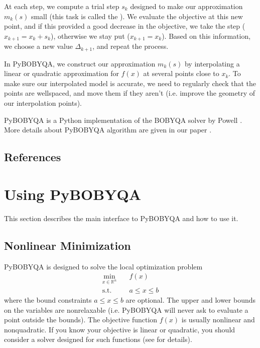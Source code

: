 \documentclass[letterpaper,10pt,english]{sphinxmanual}
\begin{document}
At each step, we compute a trial step \(s_k\) designed to make our approximation \(m_k(s)\) small (this task is called the ). We evaluate the objective at this new point, and if this provided a good decrease in the objective, we take the step (\(x_{k+1}=x_k+s_k\)), otherwise we stay put (\(x_{k+1}=x_k\)). Based on this information, we choose a new value \(\Delta_{k+1}\), and repeat the process.

In Py\sphinxhyphen{}BOBYQA, we construct our approximation \(m_k(s)\) by interpolating a linear or quadratic approximation for \(f(x)\) at several points close to \(x_k\). To make sure our interpolated model is accurate, we need to regularly check that the points are well\sphinxhyphen{}spaced, and move them if they aren’t (i.e. improve the geometry of our interpolation points).

Py\sphinxhyphen{}BOBYQA is a Python implementation of the BOBYQA solver by Powell . More details about Py\sphinxhyphen{}BOBYQA algorithm are given in our paper .


\section{References}
\label{\detokenize{info:references}}

\chapter{Using Py\sphinxhyphen{}BOBYQA}
\label{\detokenize{userguide:using-py-bobyqa}}\label{\detokenize{userguide::doc}}
This section describes the main interface to Py\sphinxhyphen{}BOBYQA and how to use it.


\section{Nonlinear Minimization}
\label{\detokenize{userguide:nonlinear-minimization}}
Py\sphinxhyphen{}BOBYQA is designed to solve the local optimization problem
\begin{equation*}
\begin{split}\min_{x\in\mathbb{R}^n}  &\quad  f(x) \\
\text{s.t.} &\quad  a \leq x \leq b\end{split}
\end{equation*}
where the bound constraints \(a \leq x \leq b\) are optional. The upper and lower bounds on the variables are non\sphinxhyphen{}relaxable (i.e. Py\sphinxhyphen{}BOBYQA will never ask to evaluate a point outside the bounds). The objective function \(f(x)\) is usually nonlinear and nonquadratic. If you know your objective is linear or quadratic, you should consider a solver designed for such functions (see  for details).
\end{document}
